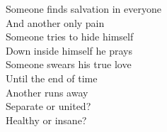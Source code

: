 Someone finds salvation in everyone \\
And another only pain \\
Someone tries to hide himself \\
Down inside himself he prays \\
Someone swears his true love \\
Until the end of time \\
Another runs away \\
Separate or united? \\
Healthy or insane?
